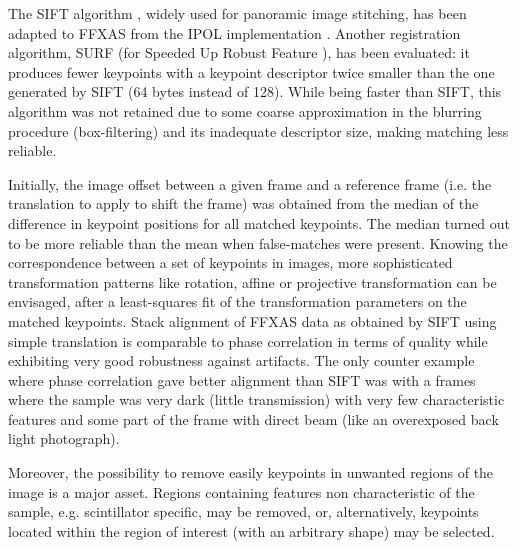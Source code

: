 \documentclass[preprint]{iucr}
\begin{document}
The SIFT algorithm \cite{Lowe99,Lowe04}, widely used for panoramic image
stitching, has been adapted to FFXAS from the IPOL implementation \cite{ASIFT}.
Another registration algorithm, SURF (for Speeded Up Robust Feature
\cite{surf}), has been evaluated: it produces fewer keypoints with a keypoint
descriptor twice smaller than the one generated by SIFT (64 bytes instead of
128).
While being faster than SIFT, this algorithm was not
retained due to some coarse approximation in the blurring procedure
(box-filtering) and its inadequate descriptor size, making matching less
reliable.

Initially, the image offset between a given frame and a reference frame (i.e.
the translation to apply to shift the frame) was obtained from the median
of the difference in keypoint positions for all matched keypoints. The median
turned out to be more reliable than the mean when false-matches were present.
Knowing the correspondence between a set of keypoints in images, more
sophisticated transformation patterns like rotation, affine or projective
transformation can be envisaged, after a least-squares fit of the
transformation parameters on the matched keypoints.
Stack alignment of FFXAS data as obtained by SIFT using simple translation is
comparable to phase correlation in terms of quality while exhibiting very good
robustness against artifacts.
The only counter example where phase correlation gave
better alignment than SIFT was with a frames where the sample was very dark
(little transmission) with very few characteristic features and some part of the
frame with direct beam (like an overexposed back light photograph).

Moreover, the possibility to remove easily keypoints in unwanted regions of
the image is a major asset.
Regions containing features non characteristic of the sample, e.g. scintillator
specific, may be removed, or, alternatively, keypoints located within the
region of interest (with an arbitrary shape) may be selected.
\end{document}
